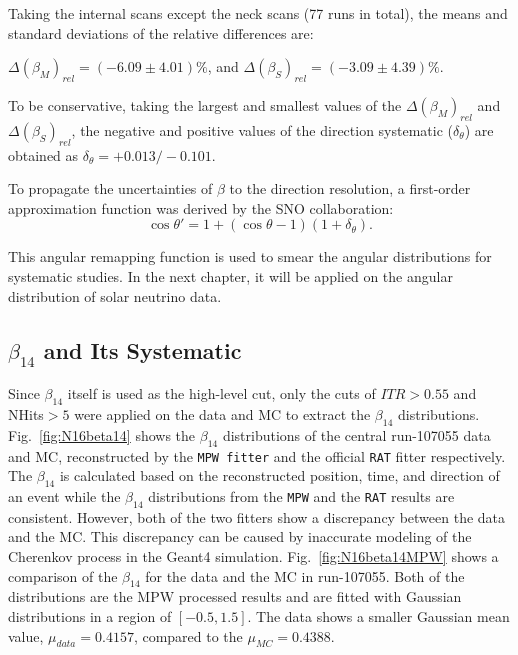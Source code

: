 Taking the internal scans except the neck scans (77 runs in total), the means and standard deviations of the relative differences are:

$\Delta(\beta_M)_{rel}=(-6.09\pm4.01)\%$, and $\Delta(\beta_S)_{rel}=(-3.09\pm4.39)\%$.

To be conservative, taking the largest and smallest values of the $\Delta(\beta_M)_{rel}$ and $\Delta(\beta_S)_{rel}$, the negative and positive values of the direction systematic ($\delta_\theta$) are obtained as $\delta_\theta=+0.013/-0.101$.

To propagate the uncertainties of $\beta$ to the direction resolution, a first-order approximation function was derived by the SNO collaboration\cite{drouin2012three}:
\begin{equation}\label{remapTheta}
\cos\theta'=1+(\cos\theta-1)(1+\delta_{\theta}).
\end{equation} 

This angular remapping function is used to smear the angular distributions for systematic studies. In the next chapter, it will be applied on the angular distribution of solar neutrino data. 

\subsection{$\beta_{14}$ and Its Systematic}
Since $\beta_{14}$ itself is used as the high-level cut, only the cuts of $ITR>0.55$ and NHits$>5$ were applied on the data and MC to extract the $\beta_{14}$ distributions.
Fig.~\ref{fig:N16beta14} shows the $\beta_{14}$ distributions of the central run-107055 data and MC, reconstructed by the \texttt{MPW fitter} and the official \texttt{RAT} fitter respectively. The $\beta_{14}$ is calculated based on the reconstructed position, time, and direction of an event while the $\beta_{14}$ distributions from the \texttt{MPW} and the \texttt{RAT} results are consistent. However, both of the two fitters show a discrepancy between the data and the MC. This discrepancy can be caused by inaccurate modeling of the Cherenkov process in the Geant4 simulation\cite{dunmore2004separation,beta14discrepancy}.
Fig.~\ref{fig:N16beta14MPW} shows a comparison of the $\beta_{14}$ for the data and the MC in run-107055. Both of the distributions are the MPW processed results and are fitted with Gaussian distributions in a region of $[-0.5,1.5]$. The data shows a smaller Gaussian mean value, $\mu_{data}=0.4157$, compared to the $\mu_{MC}=0.4388$.

